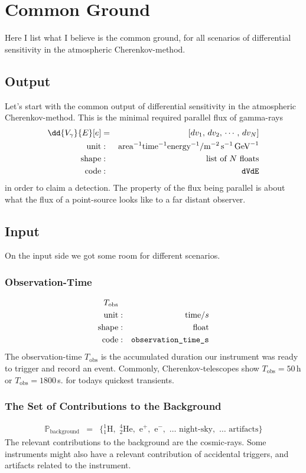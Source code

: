 \documentclass{article}%
\begin{document}
\section{Common Ground}
\label{SecCommonGround}
%
Here I list what I believe is the common ground, for all scenarios of differential sensitivity in the atmospheric Cherenkov-method.
%
\subsection{Output}
%
Let's start with the common output of differential sensitivity in the atmospheric Cherenkov-method.
%
This is the minimal required parallel flux of gamma-rays
%
\begin{eqnarray*}
\dd{V_\gamma}{E}[e] &=& [dv_1, \, dv_2, \, \cdots, \, dv_N]\\
\text{unit} &:& \text{area}^{-1} \text{time}^{-1} \text{energy}^{-1} / \text{m}^{-2}\,\text{s}^{-1}\,\text{GeV}^{-1}\\
\text{shape} &:& \text{list of}\,\,N\,\,\text{floats}\\
\text{code} &:& \verb|dVdE|
\end{eqnarray*}
%
in order to claim a detection.
%
The property of the flux being parallel is about what the flux of a point-source looks like to a far distant observer.
%
\subsection{Input}
%
On the input side we got some room for different scenarios.
%
\subsubsection*{Observation-Time}
%
\begin{eqnarray*}
T_\text{obs} && \\
\text{unit} &:& \text{time} / s\\
\text{shape} &:& \text{float}\\
\text{code} &:& \verb|observation_time_s|
\end{eqnarray*}
%
The observation-time $T_\text{obs}$ is the accumulated duration our instrument was ready to trigger and record an event.
%
Commonly, Cherenkov-telescopes show $T_\text{obs} = 50\,$h or $T_\text{obs} = 1800\,$s. for todays quickest transients.
%
\subsubsection*{The Set of Contributions to the Background}
%
\begin{eqnarray*}
\mathbb{P}_\text{background} &=& \{
{_1^1}\text{H},\,\,
{_2^4}\text{He},\,\,
\text{e}^{+},\,\,
\text{e}^{-},\,\,
\dots{}\,\,
\text{night-sky},\,\,
\dots{}\,\,
\text{artifacts}
\}
\end{eqnarray*}
%
The relevant contributions to the background are the cosmic-rays. Some instruments might also have a relevant contribution of accidental triggers, and artifacts related to the instrument.
%
\end{document}
